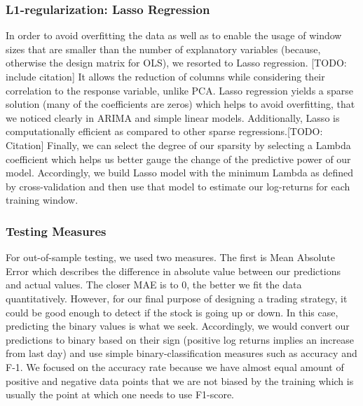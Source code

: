 \subsubsection{L1-regularization: Lasso Regression}
In order to avoid overfitting the data as well as to enable the usage of window sizes that are smaller than the number of explanatory variables (because, otherwise the design matrix for OLS), we resorted to Lasso regression. [TODO: include citation] It allows the reduction of columns while considering their correlation to the response variable, unlike PCA. Lasso regression yields a sparse solution (many of the coefficients are zeros) which helps to avoid overfitting, that we noticed clearly in ARIMA and simple linear models. Additionally, Lasso is computationally efficient as compared to other sparse regressions.[TODO: Citation] Finally, we can select the degree of our sparsity by selecting a Lambda coefficient which helps us better gauge the change of the predictive power of our model.
Accordingly, we build Lasso model with the minimum Lambda as defined by cross-validation and then use that model to estimate our log-returns for each training window.
\subsubsection{Testing Measures}
For out-of-sample testing, we used two measures. The first is Mean Absolute Error which describes the difference in absolute value between our predictions and actual values. The closer MAE is to 0, the better we fit the data quantitatively. However, for our final purpose of designing a trading strategy, it could be good enough to detect if the stock is going up or down. In this case, predicting the binary values is what we seek. Accordingly, we would convert our predictions to binary based on their sign (positive log returns implies an increase from last day) and use simple binary-classification measures such as accuracy and F-1. We focused on the accuracy rate because we have almost equal amount of positive and negative data points that we are not biased by the training which is usually the point at which one needs to use F1-score.
